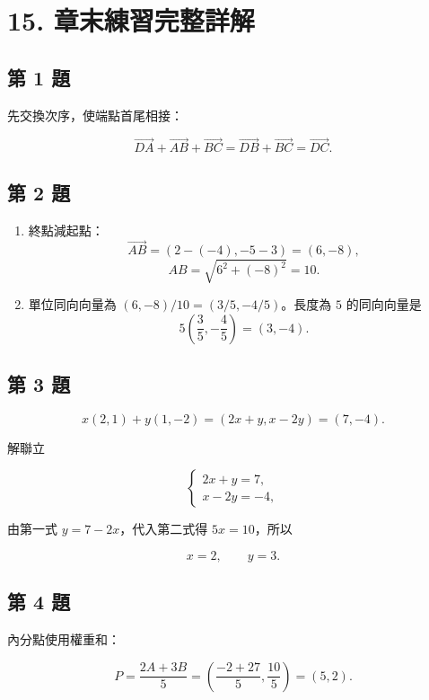 \documentclass[11pt,a4paper]{article}
\providecommand{\tightlist}{%
  \setlength{\itemsep}{0pt}\setlength{\parskip}{0pt}}
\begin{document}
\section{15. 章末練習完整詳解}\label{ux7ae0ux672bux7df4ux7fd2ux5b8cux6574ux8a73ux89e3}

\subsection{第 1 題}\label{ux7b2c-1-ux984c}

先交換次序，使端點首尾相接：

\[
\overrightarrow{DA}+\overrightarrow{AB}+\overrightarrow{BC}
=\overrightarrow{DB}+\overrightarrow{BC}
=\overrightarrow{DC}.
\]

\subsection{第 2 題}\label{ux7b2c-2-ux984c}

\begin{enumerate}
\def\labelenumi{\arabic{enumi}.}
\tightlist
\item
  終點減起點：
  \[
  \overrightarrow{AB}=(2-(-4),-5-3)=(6,-8),
  \]
  \[
  AB=\sqrt{6^2+(-8)^2}=10.
  \]
\item
  單位同向向量為 \((6,-8)/10=(3/5,-4/5)\)。長度為 \(5\) 的同向向量是
  \[
  5\left(\frac35,-\frac45\right)=(3,-4).
  \]
\end{enumerate}

\subsection{第 3 題}\label{ux7b2c-3-ux984c}

\[
x(2,1)+y(1,-2)=(2x+y,x-2y)=(7,-4).
\]

解聯立

\[
\begin{cases}2x+y=7,\\x-2y=-4,\end{cases}
\]

由第一式 \(y=7-2x\)，代入第二式得 \(5x=10\)，所以

\[
x=2,\qquad y=3.
\]

\subsection{第 4 題}\label{ux7b2c-4-ux984c}

內分點使用權重和：

\[
P=\frac{2A+3B}{5}
=\left(\frac{-2+27}{5},\frac{10}{5}\right)=(5,2).
\]
\end{document}
